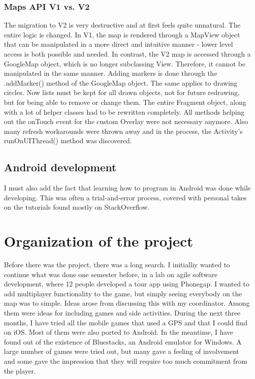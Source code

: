 \documentclass{article}
\begin{document}
\subsubsection{Maps API V1 vs. V2}

The migration to V2 is very destructive and at first feels quite unnatural. The
entire logic is changed. In V1, the map is rendered through a MapView object
that can be manipulated in a more direct and intuitive manner - lower level
access is both possible and needed. In contrast, the V2 map is accessed through
a GoogleMap object, which is no longer subclassing View. Therefore, it cannot be
manipulated in the same manner. Adding markers is done through the .addMarker()
method of the GoogleMap object. The same applies to drawing circles. Now lists
must be kept for all drawn objects, not for future redrawing, but for being able
to remove or change them. The entire Fragment object, along with a lot of
helper classes had to be rewritten completely. All methods helping out the
onTouch event for the custom Overlay were not necessary anymore. Also many
refresh workarounds were thrown away and in the process, the Activity's
runOnUIThread() method was discovered. 

\subsection{Android development}

I must also add the fact that learning how to program in Android was done while
developing. This was often a trial-and-error process, covered with personal
takes on the tutorials found mostly on StackOverflow.

\section{Organization of the project}

Before there was the project, there was a long search. I initialliy wanted to
continue what was done one semester before, in a lab on agile software
development, where 12 people developed a tour app using Phonegap. I wanted to
add multiplayer functionality to the game, but simply seeing everybody on the
map was to simple. Ideas arose from discussing this with my coordinator. Among
them were ideas for including games and side activities. During the next three
months, I have tried all the mobile games that used a GPS and that I could find
on iOS. Most of them were also ported to Android. In the meantime, I have found
out of the existence of Bluestacks, an Android emulator for Windows. A large
number of games were tried out, but many gave a feeling of involvement and some
gave the impression that they will require too much commitment from the player.
\end{document}
